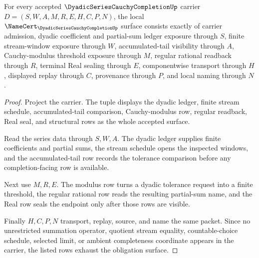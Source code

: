\begin{theorem}
\label{thm:dyadic-series-cauchy-completion-obligation-surface}
For every accepted $\DyadicSeriesCauchyCompletionUp$ carrier $D=(S,W,A,M,R,E,H,C,P,N)$, the local $\NameCert_{\DyadicSeriesCauchyCompletionUp}$ surface consists exactly of carrier admission, dyadic coefficient and partial-sum ledger exposure through $S$, finite stream-window exposure through $W$, accumulated-tail visibility through $A$, Cauchy-modulus threshold exposure through $M$, regular rational readback through $R$, terminal Real sealing through $E$, componentwise transport through $H$, displayed replay through $C$, provenance through $P$, and local naming through $N$.
\end{theorem}
\begin{proof}
Project the carrier. The tuple displays the dyadic ledger, finite stream schedule, accumulated-tail comparison, Cauchy-modulus row, regular readback, Real seal, and structural rows as the whole accepted surface.

Read the series data through $S,W,A$. The dyadic ledger supplies finite coefficients and partial sums, the stream schedule opens the inspected windows, and the accumulated-tail row records the tolerance comparison before any completion-facing row is available.

Next use $M,R,E$. The modulus row turns a dyadic tolerance request into a finite threshold, the regular rational row reads the resulting partial-sum name, and the Real row seals the endpoint only after those rows are visible.

Finally $H,C,P,N$ transport, replay, source, and name the same packet. Since no unrestricted summation operator, quotient stream equality, countable-choice schedule, selected limit, or ambient completeness coordinate appears in the carrier, the listed rows exhaust the obligation surface.
\end{proof}

